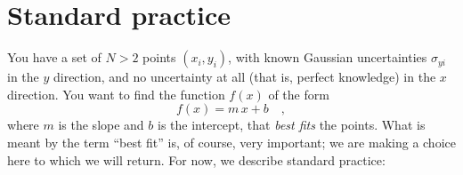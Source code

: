 \documentclass[12pt,twoside,pdftex]{article}
\begin{document}
\section{Standard practice}\label{sec:standard}

You have a set of $N>2$ points $(x_i,y_i)$, with known Gaussian
uncertainties $\sigma_{yi}$ in the $y$ direction, and no uncertainty
at all (that is, perfect knowledge) in the $x$ direction.  You want to
find the function $f(x)$ of the form
\begin{equation}\label{eq:fofx}
f(x) = m\,x + b \quad ,
\end{equation}
where $m$ is the slope and $b$ is the intercept, that \emph{best fits}
the points.  What is meant by the term ``best fit'' is, of course,
very important; we are making a choice here to which we will return.
For now, we describe standard practice:
\end{document}

